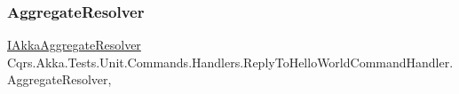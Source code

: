 \subsubsection{\texorpdfstring{Aggregate\+Resolver}{AggregateResolver}}
{\footnotesize\ttfamily \hyperlink{interfaceCqrs_1_1Akka_1_1Domain_1_1IAkkaAggregateResolver}{I\+Akka\+Aggregate\+Resolver} Cqrs.\+Akka.\+Tests.\+Unit.\+Commands.\+Handlers.\+Reply\+To\+Hello\+World\+Command\+Handler.\+Aggregate\+Resolver\hspace{0.3cm}{\ttfamily [get]}, {\ttfamily [protected]}}

